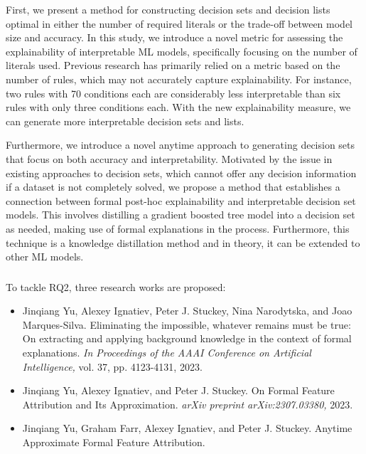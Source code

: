 First, we present a method for constructing decision sets and decision lists optimal in
either the number of required literals or the trade-off between model size and accuracy.
%
In this study, we introduce a novel metric for assessing the explainability of 
interpretable ML models, specifically focusing on the number of literals used.
%
Previous research has primarily relied on a metric based on the number of rules, 
which may not accurately capture explainability.
%
For instance, two rules with 70 conditions each are considerably
less interpretable than six rules with only three conditions each.
%
With the new explainability measure, we can generate more interpretable decision sets and lists.

Furthermore, we introduce a novel anytime approach to
generating decision sets that focus on both
accuracy and interpretability.
%
Motivated by the issue in existing approaches to decision sets,
which cannot offer any decision information 
if a dataset is not completely solved,
we propose a method that establishes a connection
between formal post-hoc explainability and interpretable decision set models.
%
This involves distilling a gradient boosted tree model 
into a decision set as needed,
making use of formal explanations in the process.
%
%
Furthermore, this technique is a knowledge distillation method and in theory, it can be extended
to other ML models.


\subsubsection{}

To tackle RQ2, three research works are proposed: 

\begin{itemize}

	\item Jinqiang Yu, Alexey Ignatiev, Peter J. Stuckey, Nina Narodytska, and Joao Marques-Silva.
Eliminating the impossible, whatever remains must be true: On extracting and applying background
knowledge in the context of formal explanations. \emph{In Proceedings of the AAAI Conference on Artificial
Intelligence,} vol. 37, pp. 4123-4131, 2023.

	\item Jinqiang Yu, Alexey Ignatiev, and Peter J. Stuckey. On Formal Feature Attribution and Its
Approximation. \emph{arXiv preprint arXiv:2307.03380,} 2023.

	\item Jinqiang Yu, Graham Farr, Alexey Ignatiev, and Peter J. Stuckey. Anytime Approximate Formal
Feature Attribution. 
\end{itemize}



